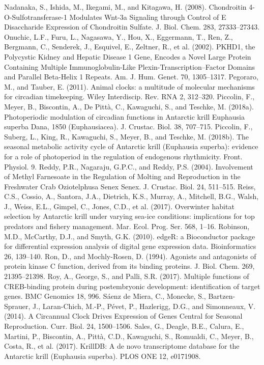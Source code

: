 Nadanaka, S., Ishida, M., Ikegami, M., and Kitagawa, H. (2008). Chondroitin 4-O-Sulfotransferase-1 Modulates Wnt-3a Signaling through Control of E Disaccharide Expression of Chondroitin Sulfate. J. Biol. Chem. 283, 27333–27343.
Onuchic, L.F., Furu, L., Nagasawa, Y., Hou, X., Eggermann, T., Ren, Z., Bergmann, C., Senderek, J., Esquivel, E., Zeltner, R., et al. (2002). PKHD1, the Polycystic Kidney and Hepatic Disease 1 Gene, Encodes a Novel Large Protein Containing Multiple Immunoglobulin-Like Plexin-Transcription–Factor Domains and Parallel Beta-Helix 1 Repeats. Am. J. Hum. Genet. 70, 1305–1317.
Pegoraro, M., and Tauber, E. (2011). Animal clocks: a multitude of molecular mechanisms for circadian timekeeping. Wiley Interdiscip. Rev. RNA 2, 312–320.
Piccolin, F., Meyer, B., Biscontin, A., De Pittà, C., Kawaguchi, S., and Teschke, M. (2018a). Photoperiodic modulation of circadian functions in Antarctic krill Euphausia superba Dana, 1850 (Euphausiacea). J. Crustac. Biol. 38, 707–715.
Piccolin, F., Suberg, L., King, R., Kawaguchi, S., Meyer, B., and Teschke, M. (2018b). The seasonal metabolic activity cycle of Antarctic krill (Euphausia superba): evidence for a role of photoperiod in the regulation of endogenous rhythmicity. Front. Physiol. 9.
Reddy, P.R., Nagaraju, G.P.C., and Reddy, P.S. (2004). Involvement of Methyl Farnesoate in the Regulation of Molting and Reproduction in the Freshwater Crab Oziotelphusa Senex Senex. J. Crustac. Biol. 24, 511–515.
Reiss, C.S., Cossio, A., Santora, J.A., Dietrich, K.S., Murray, A., Mitchell, B.G., Walsh, J., Weiss, E.L., Gimpel, C., Jones, C.D., et al. (2017). Overwinter habitat selection by Antarctic krill under varying sea-ice conditions: implications for top predators and fishery management. Mar. Ecol. Prog. Ser. 568, 1–16.
Robinson, M.D., McCarthy, D.J., and Smyth, G.K. (2010). edgeR: a Bioconductor package for differential expression analysis of digital gene expression data. Bioinformatics 26, 139–140.
Ron, D., and Mochly-Rosen, D. (1994). Agonists and antagonists of protein kinase C function, derived from its binding proteins. J. Biol. Chem. 269, 21395–21398.
Roy, A., George, S., and Palli, S.R. (2017). Multiple functions of CREB-binding protein during postembryonic development: identification of target genes. BMC Genomics 18, 996.
Sáenz de Miera, C., Monecke, S., Bartzen-Sprauer, J., Laran-Chich, M.-P., Pévet, P., Hazlerigg, D.G., and Simonneaux, V. (2014). A Circannual Clock Drives Expression of Genes Central for Seasonal Reproduction. Curr. Biol. 24, 1500–1506.
Sales, G., Deagle, B.E., Calura, E., Martini, P., Biscontin, A., Pittà, C.D., Kawaguchi, S., Romualdi, C., Meyer, B., Costa, R., et al. (2017). KrillDB: A de novo transcriptome database for the Antarctic krill (Euphausia superba). PLOS ONE 12, e0171908.
